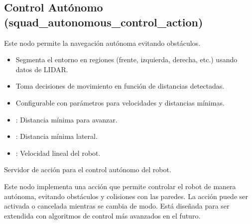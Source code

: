 \documentclass[a4paper,10pt,spanish]{sphinxmanual}
\begin{document}
\sphinxstepscope


\subsection{Control Autónomo (squad\_autonomous\_control\_action)}
\label{\detokenize{squad_autonomous_control_action:control-autonomo-squad-autonomous-control-action}}\label{\detokenize{squad_autonomous_control_action::doc}}
\sphinxAtStartPar
Este nodo permite la navegación autónoma evitando obstáculos.

\sphinxAtStartPar
{}
\begin{itemize}
\item {} 
\sphinxAtStartPar
Segmenta el entorno en regiones (frente, izquierda, derecha, etc.) usando datos de LIDAR.

\item {} 
\sphinxAtStartPar
Toma decisiones de movimiento en función de distancias detectadas.

\item {} 
\sphinxAtStartPar
Configurable con parámetros para velocidades y distancias mínimas.

\end{itemize}

\sphinxAtStartPar
{}
\begin{itemize}
\item {} 
\sphinxAtStartPar
{}: Distancia mínima para avanzar.

\item {} 
\sphinxAtStartPar
{}: Distancia mínima lateral.

\item {} 
\sphinxAtStartPar
{}: Velocidad lineal del robot.

\end{itemize}
\label{\detokenize{squad_autonomous_control_action:module-squad_autonomous_control_action}}
\sphinxAtStartPar
Servidor de acción para el control autónomo del robot.

\sphinxAtStartPar
Este nodo implementa una acción que permite controlar el robot de manera autónoma,
evitando obstáculos y colisiones con las paredes. La acción puede ser activada o
cancelada mientras se cambia de modo. Está diseñada para ser extendida con algoritmos
de control más avanzados en el futuro.
\end{document}
